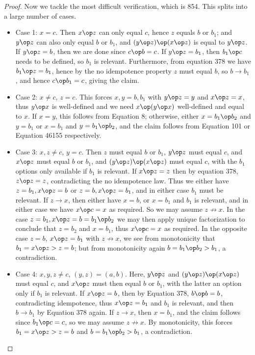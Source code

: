 \begin{proof}
Now we tackle the most difficult verification, which is 854.  This splits into a large number of cases.
\begin{itemize}
  \item Case 1: $x=c$.  Then $x \op z$ can only equal $c$, hence $z$ equals $b$ or $b_1$; and $y \op z$ can also only equal $b$ or $b_1$, and $(y \op z) \op (x \op z)$ is equal to $y \op z$.  If $y \op z = b$, then we are done since $c \op b = c$.  If $y \op z = b_1$, then $b_1 \op c$ needs to be defined, so $b_1$ is relevant.  Furthermore, from equation 378 we have $b_1 \op z = b_1$, hence by the no idempotence property $z$ must equal $b$, so $b \to b_1$, and hence $c \op b_1 = c$, giving the claim.
  \item Case 2: $x \neq c$, $z = c$.  This forces $x,y=b,b_1$ with $y \op z = y$ and $x \op z = x$, thus $y \op x$ is well-defined and we need $x \op (y \op x)$ well-defined and equal to $x$.  If $x=y$, this follows from Equation 8; otherwise, either $x = b_1 \op b_2$ and $y = b_1$ or $x = b_1$ and $y = b_1 \op b_2$, and the claim follows from Equation 101 or Equation 46155 respectively.
  \item Case 3: $x, z \neq c$, $y = c$.  Then $z$ must equal $b$ or $b_1$, $y \op z$ must equal $c$, and $x \op z$ must equal $b$ or $b_1$, and $(y \op z) \op (x \op z)$ must equal $c$, with the $b_1$ options only available if $b_1$ is relevant.  If $x \op z = z$ then by equation 378, $z \op z = z$, contradicting the no idempotence law.  Thus we either have $z=b_1, x \op z = b$ or $z = b, x \op z = b_1$, and in either case $b_1$ must be relevant.  If $z \to x$, then either have $x=b$, or $x = b_1$ and $b_1$ is relevant, and in either case we have $x \op c = x$ as required.  So we may assume $z \not \to x$.  In the case $z = b_1, x \op z = b = b_1 \op b_2$ we may then apply unique factorization to conclude that $z = b_2$ and $x = b_1$, thus $x \op c = x$ as required.  In the opposite case $z = b$, $x \op z = b_1$ with $z \not \to x$, we see from monotonicity that $b_1 = x \op z > z = b$; but from monotonicity again $b = b_1 \op b_2 > b_1$, a contradiction.
  \item Case 4: $x,y,z \neq c$, $(y,z) = (a,b)$.  Here, $y \op z$ and $(y \op z) \op (x \op z)$ must equal $c$, and $x \op z$ must then equal $b$ or $b_1$, with the latter an option only if $b_1$ is relevant.  If $x \op z = b$, then by Equation 378, $b \op b = b$, contradicting idempotence, thus $x \op z = b_1$ and $b_1$ is relevant, and then $b \to b_1$ by Equation 378 again.  If $z \to x$, then $x = b_1$, and the claim follows since $b_1 \op c = c$, so we may assume $z \not \to x$.  By monotonicity, this forces $b_1 = x \op z > z = b$ and $b = b_1 \op b_2 > b_1$, a contradiction.

\end{itemize}
\end{proof}
